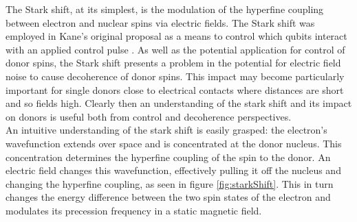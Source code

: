 The Stark shift, at its simplest, is the modulation of the hyperfine coupling between electron and nuclear spins via electric fields.
The Stark shift was employed in Kane's original proposal as a means to control which qubits interact with an applied control pulse \cite{Kane1998}.
As well as the potential application for control of donor spins, the Stark shift presents a problem in the potential for electric field noise to cause decoherence of donor spins.
This impact may become particularly important for single donors close to electrical contacts where distances are short and so fields high.
Clearly then an understanding of the stark shift and its impact on donors is useful both from control and decoherence perspectives.
\\
An intuitive understanding of the stark shift is easily grasped: the electron's wavefunction extends over space and is concentrated at the donor nucleus. 
This concentration determines the hyperfine coupling of the spin to the donor.
An electric field changes this wavefunction, effectively pulling it off the nucleus and changing the hyperfine coupling, as seen in figure \ref{fig:starkShift}.
This in turn changes the energy difference between the two spin states of the electron and modulates its precession frequency in a static magnetic field.

